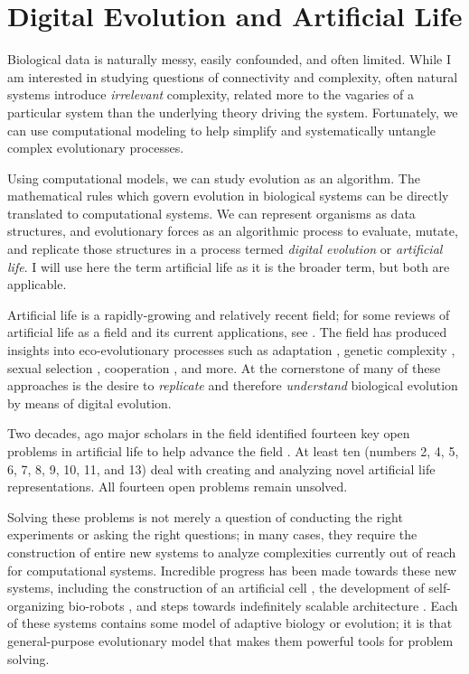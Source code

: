 \section{Digital Evolution and Artificial Life}

Biological data is naturally messy, easily confounded, and often limited. 
While I am interested in studying questions of connectivity and complexity, often natural systems introduce \textit{irrelevant} complexity, related more to the vagaries of a particular system than the underlying theory driving the system.
Fortunately, we can use computational modeling to help simplify and systematically untangle complex evolutionary processes.

Using computational models, we can study evolution as an algorithm. 
The mathematical rules which govern evolution in biological systems can be directly translated to computational systems.  
We can represent organisms as data structures, and evolutionary forces as an algorithmic process to evaluate, mutate, and replicate those structures in a process termed \textit{digital evolution} or \textit{artificial life}. 
I will use here the term artificial life as it is the broader term, but both are applicable.

Artificial life is a rapidly-growing and relatively recent field; for some reviews of artificial life as a field and its current applications, see 
\citep{oneill_digital_2003, mcmullin_thirty_2004, kim_comprehensive_2006, aguilar_past_2014}. 
The field has produced insights into eco-evolutionary processes such as
adaptation \citep{wilke_evolution_2001}, 
genetic complexity \citep{ostman_impact_2011}, 
sexual selection \citep{bohm_sexual_2020},
cooperation \citep{vostinar_spatial_2019}, 
and more.
At the cornerstone of many of these approaches is the desire to \textit{replicate} and therefore \textit{understand} biological evolution by means of digital evolution. 

Two decades, ago major scholars in the field identified fourteen key open problems in artificial life to help advance the field \citep{bedau_open_2000}. 
At least ten (numbers 2, 4, 5, 6, 7, 8, 9, 10, 11, and 13) deal with creating and analyzing novel artificial life representations. 
All fourteen open problems remain unsolved.

Solving these problems is not merely a question of conducting the right experiments or asking the right questions; in many cases, they require the construction of entire new systems to analyze complexities currently out of reach for computational systems. 
Incredible progress has been made towards these new systems, including 
the construction of an artificial cell \citep{frischmon_build--cell_2021}, 
the development of self-organizing bio-robots \citep{kriegman_scalable_2020}, and 
steps towards indefinitely scalable architecture \citep{ackley_indefinitely_2014}. 
Each of these systems contains some model of adaptive biology or evolution; it is that general-purpose evolutionary model that makes them powerful tools for problem solving.


